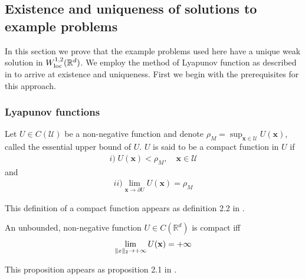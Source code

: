 \subsection{Existence and uniqueness of solutions to example problems}\label{ssec-unique--steady-fp} In this section we prove that the example problems used here have a unique weak solution in $W^{1,2}_{\rm loc}(\mathbb R^d)$.
 We employ the method of Lyapunov function as described in \cite{huang2015steady} to arrive at existence and uniqueness. First we begin with the prerequisites for this approach.
 \subsubsection{Lyapunov functions}
\begin{defn}
    Let $U \in C(\mathcal U)$ be a non-negative function and denote $\rho_M = \sup_{\mathbf x\in \mathcal U} U(\mathbf x)$,
called the essential upper bound of $U$. $U$ is said to be a compact function in $U$ if
\begin{align}
i)\; U (\mathbf x) < \rho_M,\quad \mathbf x \in \mathcal U
\end{align}
and
\begin{align}
ii) \lim_{\mathbf x\to\partial U} U (\mathbf x) = \rho_M 
\end{align}
\end{defn} This definition of a compact function appears as definition 2.2 in \cite{huang2015steady}.
\begin{prop}
An unbounded, non-negative function $U\in C(\mathbb R^d)$ is compact iff 
\begin{align}
    \lim_{\|\mathbf \mathbf x\|_2\to+\infty} U(\mathbf x) = +\infty
\end{align}
\end{prop}
This proposition appears as proposition 2.1 in \cite{huang2015steady}.

